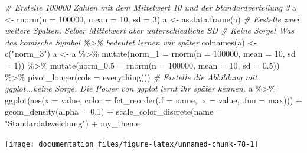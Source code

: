 \documentclass[
]{article}
\newenvironment{Shaded}{\begin{snugshade}}{\end{snugshade}}
\newcommand{\AttributeTok}[1]{\textcolor[rgb]{0.77,0.63,0.00}{#1}}
\newcommand{\CommentTok}[1]{\textcolor[rgb]{0.56,0.35,0.01}{\textit{#1}}}
\newcommand{\DecValTok}[1]{\textcolor[rgb]{0.00,0.00,0.81}{#1}}
\newcommand{\FloatTok}[1]{\textcolor[rgb]{0.00,0.00,0.81}{#1}}
\newcommand{\FunctionTok}[1]{\textcolor[rgb]{0.00,0.00,0.00}{#1}}
\newcommand{\NormalTok}[1]{#1}
\newcommand{\OtherTok}[1]{\textcolor[rgb]{0.56,0.35,0.01}{#1}}
\newcommand{\SpecialCharTok}[1]{\textcolor[rgb]{0.00,0.00,0.00}{#1}}
\newcommand{\StringTok}[1]{\textcolor[rgb]{0.31,0.60,0.02}{#1}}
\begin{document}
\begin{Shaded}
\begin{Highlighting}[]
\CommentTok{\# Erstelle 100000 Zahlen mit dem Mittelwert 10 und der Standardverteilung 3}
\NormalTok{a }\OtherTok{\textless{}{-}} \FunctionTok{rnorm}\NormalTok{(}\AttributeTok{n =} \DecValTok{100000}\NormalTok{, }\AttributeTok{mean =} \DecValTok{10}\NormalTok{, }\AttributeTok{sd =} \DecValTok{3}\NormalTok{)}
\NormalTok{a }\OtherTok{\textless{}{-}} \FunctionTok{as.data.frame}\NormalTok{(a)}
\CommentTok{\# Erstelle zwei weitere Spalten. Selber Mittelwert aber unterschiedliche SD }
\CommentTok{\# Keine Sorge! Was das komische Symbol \%\textgreater{}\% bedeutet lernen wir später}
\FunctionTok{colnames}\NormalTok{(a) }\OtherTok{\textless{}{-}} \FunctionTok{c}\NormalTok{(}\StringTok{"norm\_3"}\NormalTok{)}
\NormalTok{a }\OtherTok{\textless{}{-}}\NormalTok{ a }\SpecialCharTok{\%\textgreater{}\%}
    \FunctionTok{mutate}\NormalTok{(}\AttributeTok{norm\_1 =} \FunctionTok{rnorm}\NormalTok{(}\AttributeTok{n =} \DecValTok{100000}\NormalTok{, }\AttributeTok{mean =} \DecValTok{10}\NormalTok{, }\AttributeTok{sd =} \DecValTok{1}\NormalTok{)) }\SpecialCharTok{\%\textgreater{}\%}
    \FunctionTok{mutate}\NormalTok{(}\AttributeTok{norm\_0.5 =} \FunctionTok{rnorm}\NormalTok{(}\AttributeTok{n =} \DecValTok{100000}\NormalTok{, }\AttributeTok{mean =} \DecValTok{10}\NormalTok{, }\AttributeTok{sd =} \FloatTok{0.5}\NormalTok{)) }\SpecialCharTok{\%\textgreater{}\%}
    \FunctionTok{pivot\_longer}\NormalTok{(}\AttributeTok{cols =} \FunctionTok{everything}\NormalTok{())}
\CommentTok{\# Erstelle die Abbildung mit ggplot...keine Sorge. Die Power von ggplot lernt ihr später kennen. }
\NormalTok{a }\SpecialCharTok{\%\textgreater{}\%}
    \FunctionTok{ggplot}\NormalTok{(}\FunctionTok{aes}\NormalTok{(}\AttributeTok{x =}\NormalTok{ value, }\AttributeTok{color =} \FunctionTok{fct\_reorder}\NormalTok{(}\AttributeTok{.f =}\NormalTok{ name, }\AttributeTok{.x =}\NormalTok{ value, }\AttributeTok{.fun =}\NormalTok{ max))) }\SpecialCharTok{+}
    \FunctionTok{geom\_density}\NormalTok{(}\AttributeTok{alpha =} \FloatTok{0.1}\NormalTok{) }\SpecialCharTok{+}
    \FunctionTok{scale\_color\_discrete}\NormalTok{(}\AttributeTok{name =} \StringTok{"Standardabweichung"}\NormalTok{) }\SpecialCharTok{+}
\NormalTok{    my\_theme}
\end{Highlighting}
\end{Shaded}

\begin{center}\texttt{[image: documentation\_files/figure-latex/unnamed-chunk-78-1]} \end{center}
\end{document}
